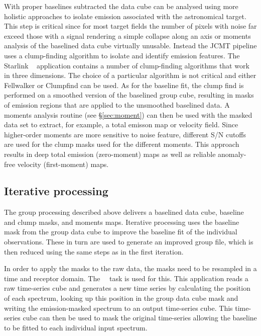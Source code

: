 \documentclass[final,authoryear,5p,times,twocolumn]{elsarticle}
\begin{document}
With proper baselines subtracted  the data cube can be analysed  using more
holistic approaches to isolate emission associated with the astronomical
target. This step is critical since for most target fields the number of pixels with
noise far exceed those with a signal rendering a simple collapse along an axis
or moments  analysis of the baselined data cube virtually unusable. Instead
the JCMT pipeline uses a clump-finding algorithm to isolate and identify
emission features.
The Starlink \cupid\ \citep[][]{2007ASPC..376..425B} application contains
a number of clump-finding algorithms that work in three dimensions.
The choice of a particular algorithm is not critical and either Fellwalker or
Clumpfind \citep[][]{1994ApJ...428..693W} can be used.
As for the baseline fit, the clump find is performed on  a smoothed version
of the baselined group cube, resulting in masks of emission regions that
are applied to the unsmoothed baselined data. A moments analysis routine
(see \S \ref{sec:moment}) can then be used with the masked data set to
extract, for example, a total emisson map or velocity field. Since higher-order moments are
more sensitive to noise feature, different S/N cutoffs are used for the
clump masks used for the different moments. This approach results in deep
total emission (zero-moment) maps as well as reliable anomaly-free
velocity (first-moment) maps.


\subsection{Iterative processing}

The group processing described above delivers a baselined data cube,
baseline and clump masks, and moments maps. Iterative processing uses
the baseline mask from the group data cube to improve the baseline fit
of the individual observations. These in turn are used to generate an improved
group file, which is then reduced using the same steps as in the first iteration.

In order to apply the masks to the raw data, the masks need to be resampled
in a time and receptor domain. The \smurf\ \unmakecube\ task
\citep[][]{SUN258} is used for this. This application
reads a raw time-series cube and generates a new time series by
calculating the position of each spectrum, looking up this position in
the group data cube mask and writing the emission-masked spectrum to
an output time-series cube. This time-series cube can then be used to
mask the original time-series allowing the baseline to be fitted to
each individual input spectrum.
\end{document}
